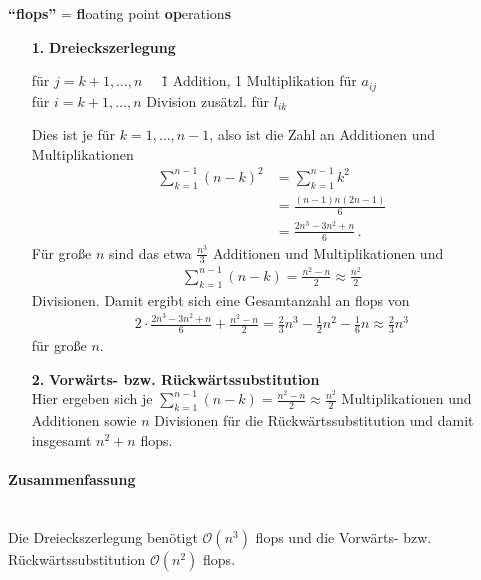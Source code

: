 \textbf{\enquote{flops} }= \textbf{fl}oating point \textbf{op}eration\textbf{s}
\begin{enumerate}
\item[\textbf{1.}] \textbf{Dreieckszerlegung} 
  \begin{tabbing}
    für $j=k+1, \ldots, n\quad$ \= 1 Addition, 1 Multiplikation für
    $a_{ij}$ \\
    für $i=k+1, \ldots, n$  Division zusätzl. für $ l_{ik}$
  \end{tabbing}
  Dies ist je für $k=1, \ldots, n-1$, also ist die Zahl an Additionen und Multiplikationen
  \begin{align*}
    \sum_{k=1}^{n-1}(n-k)^2 &= \sum_{k=1}^{n-1}k^2 \\
                            &= \frac{(n-1)n(2n-1)}{6} \\
                            &= \frac{2n^3-3n^2+n}{6}\, .
  \end{align*}
  Für große $n$ sind das etwa $\frac{n^3}{3}$ Additionen und Multiplikationen und
  \begin{gather*}
    \sum_{k=1}^{n-1} (n-k) = \frac{n^2-n}{2} \approx \frac{n^2}{2}
  \end{gather*}
  Divisionen.
  Damit ergibt sich eine Gesamtanzahl an flops von
  \begin{gather*}
    2\cdot\frac{2n^3-3n^2+n}{6} + \frac{n^2-n}{2} 
    = \frac{2}{3} n^3 - \frac{1}{2}n^2 - \frac{1}{6} n
    \approx \frac{2}{3}n^3
  \end{gather*}
  für große $n$.
  
\item[\textbf{2.}] \textbf{Vorwärts- bzw. Rückwärtssubstitution}  \\
  Hier ergeben sich je
  $\sum_{k=1}^{n-1} (n-k) = \frac{n^2-n}{2} \approx \frac{n^2}{2}$
  Multiplikationen und Additionen sowie 
  $n$ Divisionen für die Rückwärtssubstitution und damit insgesamt $n^2+n$ flops.	
\end{enumerate}
\paragraph{Zusammenfassung}~ \\
Die Dreieckszerlegung benötigt $\mathcal{O}(n^3)$ flops und 
die Vorwärts- bzw. Rückwärtssubstitution $\mathcal{O}(n^2)$ flops.



